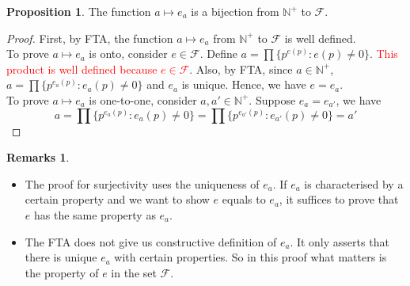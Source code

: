 \documentclass[14pt]{article}
\theoremstyle{definition}
\newtheorem*{remark}{Remarks}
\newtheorem{proposition}[definition]{Proposition}
\begin{document}
\vspace{2mm} %

\begin{proposition}
    The function $a\mapsto e_a$ is a bijection from $\mathbb{N}^+$ to $\mathcal{F}$.
\end{proposition}

\begin{proof}
    First, by FTA, the function $a\mapsto e_a$ from $\mathbb{N}^+$ to $\mathcal{F}$ is well defined.\\
    To prove $a\mapsto e_a$ is onto, consider $e\in \mathcal{F}$. Define $a=\prod \{p^{e(p)}\colon e(p)\not=0\}$. \textcolor{red}{This product is well defined because $e\in \mathcal{F}$}. Also, by FTA, since $a\in \mathbb{N}^+$, $a=\prod \{p^{e_a(p)}\colon e_a(p)\not=0\}$ and $e_a$ is unique. Hence, we have $e=e_a$.\\
    To prove $a\mapsto e_a$ is one-to-one, consider $a, a' \in \mathbb{N}^+$. Suppose $e_a=e_{a'}$, we have
    \begin{equation*}
       a=\prod \{p^{e_a(p)}\colon e_a(p)\not=0\}=\prod \{p^{e_{a'}(p)}\colon e_{a'}(p)\not=0\}=a' 
    \end{equation*}
\end{proof}

\begin{remark}\hfill
    \begin{itemize}
        \item The proof for surjectivity uses the uniqueness of $e_a$. If $e_a$ is characterised by a certain property and we want to show $e$ equals to $e_a$, it suffices to prove that $e$ has the same property as $e_a$.
        \item The FTA does not give us constructive definition of $e_a$. It only asserts that there is unique $e_a$ with certain properties. So in this proof what matters is the property of $e$ in the set $\mathcal{F}$.
    \end{itemize}
\end{remark}

\vspace{3mm} %
\end{document}
